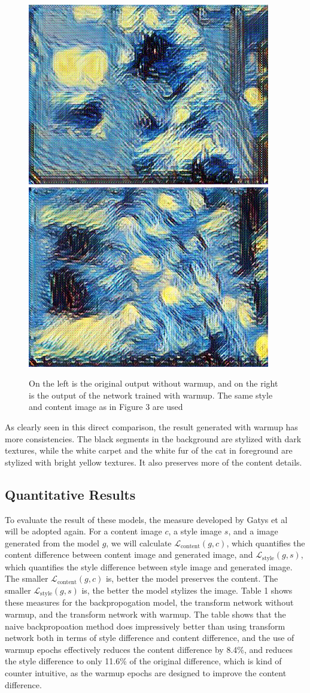 \documentclass[10pt,twocolumn,letterpaper]{article}
\begin{document}
\begin{figure}[t]
\begin{center}
\includegraphics[width=0.45\linewidth]{generated_net.jpg} \includegraphics[width=0.45\linewidth]{generated_net_warmup.jpg}	
\end{center}
   \caption{On the left is the original output without warmup, and on the right is the output of the network trained with warmup. The same style and content image as in Figure 3 are used}
\label{fig:long}
\label{fig:onecol}
\end{figure}
As clearly seen in this direct comparison, the result generated with warmup has more consistencies. The black segments in the background are stylized with dark textures, while the white carpet and the white fur of the cat in foreground are stylized with bright yellow textures. It also preserves more of the content details. 

\subsection{Quantitative Results}
To evaluate the result of these models, the measure developed by Gatys et al~\cite{Gatys} will be adopted again. For a content image $c$, a style image $s$, and a image generated from the model $g$, we will calculate $\mathcal{L}_{\text{content}}(g, c)$, which quantifies the content difference between content image and generated image, and $\mathcal{L}_{\text{style}}(g, s)$, which quantifies the style difference between style image and generated image. The smaller $\mathcal{L}_{\text{content}}(g, c)$ is, better the model preserves the content. The smaller $\mathcal{L}_{\text{style}}(g, s)$ is, the better the model stylizes the image. Table 1 shows these measures for the backpropogation model, the transform network without warmup, and the transform network with warmup. The table shows that the naive backpropoation method does impressively better than using transform network both in terms of style difference and content difference, and the use of warmup epochs effectively reduces the content difference by 8.4\%, and reduces the style difference to only 11.6\% of the original difference, which is kind of counter intuitive, as the warmup epochs are designed to improve the content difference. \\
\end{document}
